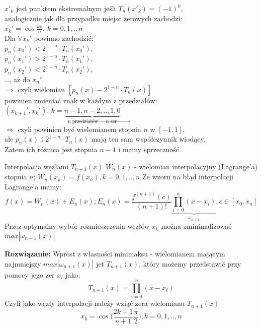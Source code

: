 \begin{frame}
		$x'_k$ jest punktem ekstremalnym jeśli $T_n(x'_k)=(-1)^k$,\\
		analogicznie jak dla przypadku miejsc zerowych zachodzi:\\ $x_k'=\cos\frac{k\pi}{n}$, $k=0,1,.,n$\\
        Dla $\forall x_k'$ powinno zachodzić: \\
        $p_n(x_0') < 2^{1-n} \cdot T_n(x_0')$, \\
        $p_n(x_1') > 2^{1-n} \cdot T_n(x_1')$, \\
        $p_n(x_2') < 2^{1-n} \cdot T_n(x_2')$, \\
        \ldots , aż do $x_n'$ \\
        $\Rightarrow$ czyli wielomian $[p_n(x) - 2^{1-n} \cdot T_n(x)]$ \\
        powinien zmieniać znak w każdym z przedziałów: \\
        $(x_{k+1}',x_k')$, $k = \underbrace{n-1, n-2,..,1,0}_{\text{n przedziałów $\rightarrow$ n zer}} $\\ 
         $\Rightarrow $ czyli powinien być wielomianem stopnia $n$ w $[-1,1]$, \\ 
         ale $p_n(x)$ i $2^{1-n} \cdot T_n(x)$ mają ten sam współczynnik wiodący, \\
         Zatem ich różnica jest stopnia $n-1$ i mamy sprzeczność.
	
\end{frame}
\begin{frame}{Interpolacja  węzłami $T_{n+1}(x)$}
	$W_n(x)$ - wielomian interpolacyjny (Lagrange'a) stopnia $n$; $W_n(x_k) = f(x_k),k=0,1,..,n$
	Ze wzoru na błąd interpolacji Lagrange'a mamy:
    $$f(x) = W_n(x)+E_n(x); E_n(x) = \frac{f^{(n+1)}(c)}{(n+1)!}\underbrace{\prod_{i=0}^{n}(x-x_i)}_{\omega_{n+1}}
	, c \in [x_0,x_n]$$
    Przez optymalny wybór rozmieszczenia węzłów $x_k$ można zminimalizować $max|\omega_{n+1}(x)|$\newline
    \end{frame}
    \begin{frame}
   \textbf{Rozwiązanie:} Wprost z własności minimaksu - wielomianem mającym najmniejszy $max|\omega_{n+1}(x)|$ jet $T_{n+1}(x)$, który możemy przedstawić przy pomocy jego zer $x_i$ jako:
   $$T_{n+1}(x)=\prod_{i=0}^{n}(x-x_i)$$
    Czyli jako węzły interpolacji należy wziąć zera wielomianu $T_{n+1}(x)$
    $$x_k = \cos \Big(\frac{2k+1}{n+1}\frac{\pi}{2}\Big), k=0,1,..,n $$
    
\end{frame}
